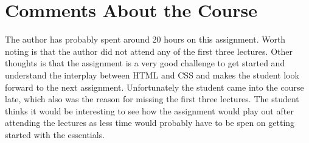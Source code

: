 \documentclass[a4paper]{scrartcl}
\begin{document}
\section{Comments About the Course}

The author has probably spent around 20 hours on this assignment. Worth noting is that the author did not attend any of the first three lectures. Other thoughts is that the assignment is a very good challenge to get started and understand the interplay between HTML and CSS and makes the student look forward to the next assignment. Unfortunately the student came into the course late, which also was the reason for missing the first three lectures. The student thinks it would be interesting to see how the assignment would play out after attending the lectures as less time would probably have to be spen on getting started with the essentials.

\printbibliography
\end{document}
